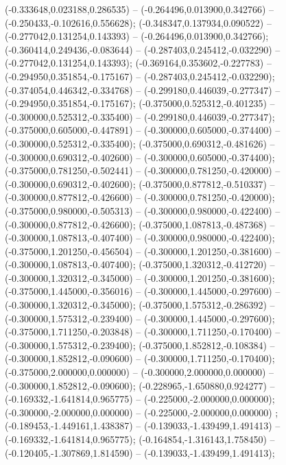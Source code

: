  (-0.333648,0.023188,0.286535) -- (-0.264496,0.013900,0.342766) -- (-0.250433,-0.102616,0.556628);
 (-0.348347,0.137934,0.090522) -- (-0.277042,0.131254,0.143393) -- (-0.264496,0.013900,0.342766);
 (-0.360414,0.249436,-0.083644) -- (-0.287403,0.245412,-0.032290) -- (-0.277042,0.131254,0.143393);
 (-0.369164,0.353602,-0.227783) -- (-0.294950,0.351854,-0.175167) -- (-0.287403,0.245412,-0.032290);
 (-0.374054,0.446342,-0.334768) -- (-0.299180,0.446039,-0.277347) -- (-0.294950,0.351854,-0.175167);
 (-0.375000,0.525312,-0.401235) -- (-0.300000,0.525312,-0.335400) -- (-0.299180,0.446039,-0.277347);
 (-0.375000,0.605000,-0.447891) -- (-0.300000,0.605000,-0.374400) -- (-0.300000,0.525312,-0.335400);
 (-0.375000,0.690312,-0.481626) -- (-0.300000,0.690312,-0.402600) -- (-0.300000,0.605000,-0.374400);
 (-0.375000,0.781250,-0.502441) -- (-0.300000,0.781250,-0.420000) -- (-0.300000,0.690312,-0.402600);
 (-0.375000,0.877812,-0.510337) -- (-0.300000,0.877812,-0.426600) -- (-0.300000,0.781250,-0.420000);
 (-0.375000,0.980000,-0.505313) -- (-0.300000,0.980000,-0.422400) -- (-0.300000,0.877812,-0.426600);
 (-0.375000,1.087813,-0.487368) -- (-0.300000,1.087813,-0.407400) -- (-0.300000,0.980000,-0.422400);
 (-0.375000,1.201250,-0.456504) -- (-0.300000,1.201250,-0.381600) -- (-0.300000,1.087813,-0.407400);
 (-0.375000,1.320312,-0.412720) -- (-0.300000,1.320312,-0.345000) -- (-0.300000,1.201250,-0.381600);
 (-0.375000,1.445000,-0.356016) -- (-0.300000,1.445000,-0.297600) -- (-0.300000,1.320312,-0.345000);
 (-0.375000,1.575312,-0.286392) -- (-0.300000,1.575312,-0.239400) -- (-0.300000,1.445000,-0.297600);
 (-0.375000,1.711250,-0.203848) -- (-0.300000,1.711250,-0.170400) -- (-0.300000,1.575312,-0.239400);
 (-0.375000,1.852812,-0.108384) -- (-0.300000,1.852812,-0.090600) -- (-0.300000,1.711250,-0.170400);
 (-0.375000,2.000000,0.000000) -- (-0.300000,2.000000,0.000000) -- (-0.300000,1.852812,-0.090600);
 (-0.228965,-1.650880,0.924277) -- (-0.169332,-1.641814,0.965775) -- (-0.225000,-2.000000,0.000000);
 (-0.300000,-2.000000,0.000000) -- (-0.225000,-2.000000,0.000000) ;
 (-0.189453,-1.449161,1.438387) -- (-0.139033,-1.439499,1.491413) -- (-0.169332,-1.641814,0.965775);
 (-0.164854,-1.316143,1.758450) -- (-0.120405,-1.307869,1.814590) -- (-0.139033,-1.439499,1.491413);
